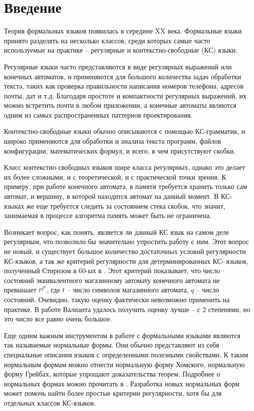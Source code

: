 \chapter{Введение} \label{chapter0}


Теория формальных языков появилась в середине XX века. 
Формальные языки принято разделять на несколько классов, среди которых самые часто используемые на практике -- 
регулярные и контекстно-свободные (КС) языки. 

Регулярные языки часто представляются в виде регулярных выражений или
конечных автоматов, и применяются для большого количества задач обработки текста, 
таких как проверка правильности написания номеров телефона, адресов почты, дат и т.д.
Благодаря простоте и компактности регулярных выражений, их можно встретить почти в любом
приложении, а конечные автоматы являются одним из самых распространенных паттернов проектирования.

Контекстно-свободные языки обычно описываются с помощью КС-грамматик,
и широко применяются для обработки и анализа текста программ, файлов конфигурации, математических
формул, и всего, в чем присутствуют скобки.

Класс контекстно-свободных языков шире класса регулярных, однако это делает их более сложными,
и с теоретической, и с практической точки зрения. К примеру, при работе конечного автомата,
в памяти требуется хранить только сам автомат, и вершину, в которой находится автомат на данный 
момент. В КС-языках же еще требуется следить за состоянием стека скобок,
что значит, занимаемая в процессе алгоритма память может быть не ограничена. 

Возникает вопрос, как понять, является ли данный КС язык на самом деле регулярным, что позволило бы
значительно упростить работу с ним. Этот вопрос не новый, и существует большое количество
достаточных условий регулярности КС-языков, а так же критерий регулярности для детерминированных КС-
языков, полученный Стирнзом в 60-ых в \cite{STEARNS1967323}. Этот критерий показывает, что число состояний эквивалентного
магазинному автомату конечного автомата не превышает $t^{q^{q^{q}}}$,
где $t$ -- число символов магазинного автомата, $q$ -- число состояний.
Очевидно, такую оценку фактически невозможно применить на практике.
В работе Валианта \cite{Valiant1975RegularityAR} удалось получить оценку лучше -- с 2 степенями, 
но это число все равно очень большое. 

Еще одним важным инструментом в работе с формальными языками являются так называемые нормальные формы.
Они обычно представляют из себя специальные описания языков с определенными полезными свойствами.
К таким нормальным формам можно отнести нормальную форму Хомского, нормальную форму Грейбах,
которые упрощают доказательства теорем. Подробнее о нормальных формах можно прочитать в \cite{handbook_of_formal}.
Разработка новых нормальных форм может помочь найти более простые критерии регулярности, хотя бы для
отдельных классов КС-языков.

